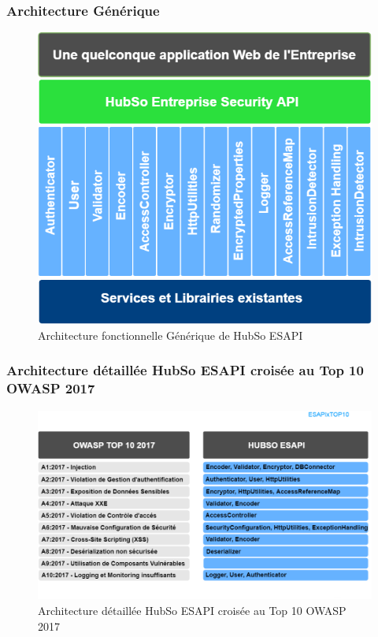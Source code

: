 \subsubsection{Architecture Générique}
\begin{figure}[H]
	\centering
	\begin{minipage}{12cm}
		\centering
		\includegraphics[width=0.7\linewidth]{parts/part04/chapters/conception/fig/ArchitectureFonctionnelleHubSoESAPI}
	\end{minipage}
	\caption{Architecture fonctionnelle Générique de HubSo ESAPI}
	\label{fig:architecturefonctionnellehubsoedsapi}
\end{figure}
\subsubsection{Architecture détaillée HubSo ESAPI croisée au Top 10 OWASP 2017}
\begin{figure}[H]
	\centering
	\begin{minipage}{12cm}
		\centering
		\includegraphics[width=0.7\linewidth,height=0.25\textheight]{parts/part04/chapters/conception/fig/EsapiXtop10}
	\end{minipage}
	\caption{Architecture détaillée HubSo ESAPI croisée au Top 10 OWASP 2017}
	\label{fig:architecturedet}
\end{figure}
